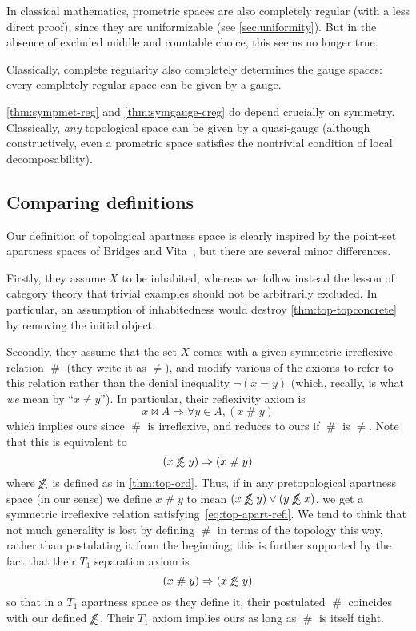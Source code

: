 \documentclass{article}
\def\apart{\mathrel{\#}}
\def\oapt{\mathrel{\!\not\,\not\lesssim}}
\let\implies\Rightarrow
\begin{document}
In classical mathematics, prometric spaces are also completely regular (with a less direct proof), since they are uniformizable (see \cref{sec:uniformity}).
But in the absence of excluded middle and countable choice, this seems no longer true.

Classically, complete regularity also completely determines the gauge spaces: every completely regular space can be given by a gauge.

\cref{thm:sympmet-reg} and \cref{thm:symgauge-creg} do depend crucially on symmetry.
Classically, \emph{any} topological space can be given by a quasi-gauge (although constructively, even a prometric space satisfies the nontrivial condition of local decomposability).


\subsection{Comparing definitions}
\label{sec:top-compare}

Our definition of topological apartness space is clearly inspired by the point-set apartness spaces of Bridges and Vita~\cite[Chapter 2]{bridges-vita}, but there are several minor differences.

Firstly, they assume $X$ to be inhabited, whereas we follow instead the lesson of category theory that trivial examples should not be arbitrarily excluded.
In particular, an assumption of inhabitedness would destroy \cref{thm:top-topconcrete} by removing the initial object.

Secondly, they assume that the set $X$ comes with a given symmetric irreflexive relation $\apart$ (they write it as $\neq$), and modify various of the axioms to refer to this relation rather than the denial inequality $\neg(x=y)$ (which, recally, is what \emph{we} mean by ``$x\neq y$'').
In particular, their reflexivity axiom is
\begin{equation}
  x\bowtie A \implies \forall y\in A, (x\apart y)\label{eq:top-apart-refl}
\end{equation}
which implies ours since $\apart$ is irreflexive, and reduces to ours if $\apart$ is $\neq$.
Note that this is equivalent to
\[ (x\oapt y) \implies (x\apart y) \]
where $\oapt$ is defined as in \cref{thm:top-ord}.
Thus, if in any pretopological apartness space (in our sense) we define $x\apart y$ to mean $(x\oapt y)\lor (y\oapt x)$, we get a symmetric irreflexive relation satisfying~\eqref{eq:top-apart-refl}.
We tend to think that not much generality is lost by defining $\apart$ in terms of the topology this way, rather than postulating it from the beginning; this is further supported by the fact that their $T_1$ separation axiom is
\[ (x\apart y) \implies (x\oapt y) \]
so that in a $T_1$ apartness space as they define it, their postulated $\apart$ coincides with our defined $\oapt$.
Their $T_1$ axiom implies ours as long as $\apart$ is itself tight.
\end{document}
